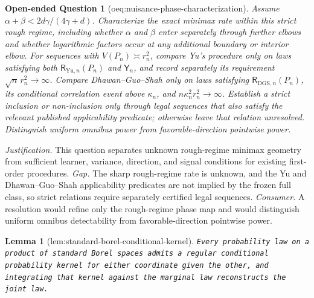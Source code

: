 \documentclass{article}
\newtheorem{lemma}{Lemma}
\newtheorem{openendedquestion}{Open-ended Question}
\begin{document}
\begin{openendedquestion}[oeq:nuisance-phase-characterization]\label{oeq:nuisance-phase-characterization}
Assume \(\alpha+\beta<2d\gamma/(4\gamma+d)\). Characterize the exact minimax rate within this strict rough regime, including whether \(\alpha\) and \(\beta\) enter separately through further elbows and whether logarithmic factors occur at any additional boundary or interior elbow. For sequences with \(V(P_n)\asymp r_n^2\), compare Yu's procedure only on laws satisfying both \(\mathsf R_{\mathrm{Yu},n}(P_n)\) and \(\mathsf Y_n\), and record separately its requirement \(\sqrt n\,r_n^2\to\infty\). Compare Dhawan--Guo--Shah only on laws satisfying \(\mathsf R_{\mathrm{DGS},n}(P_n)\), its conditional correlation event above \(\kappa_n\), and \(n\kappa_n^2r_n^2\to\infty\). Establish a strict inclusion or non-inclusion only through legal sequences that also satisfy the relevant published applicability predicate; otherwise leave that relation unresolved. Distinguish uniform omnibus power from favorable-direction pointwise power.
\end{openendedquestion}
\par\smallskip\noindent \textit{Justification.} This question separates unknown rough-regime minimax geometry from sufficient learner, variance, direction, and signal conditions for existing first-order procedures. \textit{Gap.} The sharp rough-regime rate is unknown, and the Yu and Dhawan--Guo--Shah applicability predicates are not implied by the frozen full class, so strict relations require separately certified legal sequences. \textit{Consumer.} A resolution would refine only the rough-regime phase map and would distinguish uniform omnibus detectability from favorable-direction pointwise power.

\begin{lemma}[lem:standard-borel-conditional-kernel]\label{lem:standard-borel-conditional-kernel}
\texttt{Every probability law on a product of standard Borel spaces admits a regular conditional probability kernel for either coordinate given the other,\allowbreak{} and integrating that kernel against the marginal law reconstructs the joint law.}
\end{lemma}
\end{document}

